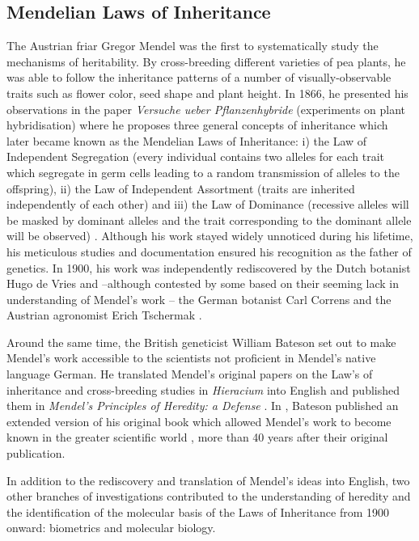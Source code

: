 \subsection{Mendelian Laws of Inheritance}
The Austrian friar Gregor Mendel was the first to systematically study the mechanisms of heritability. By cross-breeding different varieties of pea plants, he was able to follow the inheritance patterns of a number of visually-observable traits such as flower color, seed shape and plant height. In 1866, he presented his observations in the paper \textit{Versuche ueber Pflanzenhybride} (experiments on plant hybridisation) where he proposes three general concepts of inheritance which later became known as the Mendelian Laws of Inheritance: i) the Law of Independent Segregation (every individual contains two alleles for each trait which segregate in germ cells leading to a random transmission of alleles to the offspring), ii) the Law of Independent Assortment (traits are inherited independently of each other) and iii) the Law of Dominance (recessive alleles will be masked by dominant alleles and the trait corresponding to the dominant allele will be observed) \citep{Mendel1866}. Although his work stayed widely unnoticed during his lifetime, his meticulous studies and documentation ensured his recognition as the father of genetics. In 1900, his work was independently rediscovered by the Dutch botanist Hugo de Vries \citep[translation into English]{deVries1900,Hannah1950} and --although contested by some based on their seeming lack in understanding of Mendel's work \citep{Keynes2008,Monaghan1986,Monaghan1987}-- the German botanist Carl Correns \citep[translation into English]{Correns1900,Piernick1950} and the Austrian agronomist Erich Tschermak \parencite*{Tschermak1900}. 

Around the same time, the British geneticist William Bateson set out to make Mendel's work accessible to the scientists not proficient in Mendel's native language German. He translated Mendel's original papers on the Law's of inheritance \citep{Mendel1866} and cross-breeding studies in \textit{Hieracium} \citep{Mendel1869} into English and published them in \textit{Mendel's Principles of Heredity: a Defense} \citep{Bateson1902}. In \parencite*{Bateson1909}, Bateson published an extended version of his original book which allowed Mendel's work to become known in the greater scientific world \citep{Keynes2008}, more than 40 years after their original publication.

In addition to the rediscovery and translation of Mendel's ideas into English, two other branches of investigations contributed to the understanding of heredity and the identification of the molecular basis of the Laws of Inheritance from 1900 onward: biometrics and molecular biology. 

